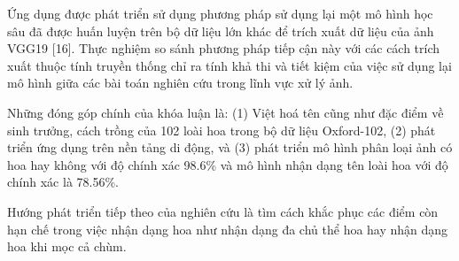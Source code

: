 \documentclass[12pt]{report}
\begin{document}
		Ứng dụng được phát triển sử dụng phương pháp sử dụng lại một mô hình học sâu đã được huấn luyện trên bộ dữ liệu lớn khác để trích xuất dữ liệu của ảnh VGG19 [16]. Thực nghiệm so sánh phương pháp tiếp cận này với các cách trích xuất thuộc tính truyền thống chỉ ra tính khả thi và tiết kiệm của việc sử dụng lại mô hình giữa các bài toán nghiên cứu trong lĩnh vực xử lý ảnh.
																																																								
		Những đóng góp chính của khóa luận là: (1) Việt hoá tên cũng như đặc điểm về sinh trưởng, cách trồng của 102 loài hoa trong bộ dữ liệu Oxford-102, (2) phát triển ứng dụng trên nền tảng di động, và (3) phát triển mô hình phân loại ảnh có hoa hay không với độ chính xác 98.6\% và mô hình nhận dạng tên loài hoa với độ chính xác là 78.56\%.
																																																								
		Hướng phát triển tiếp theo của nghiên cứu là  tìm cách khắc phục các điểm còn hạn chế trong việc nhận dạng hoa như nhận dạng đa chủ thể hoa hay nhận dạng hoa khi mọc cả chùm.															
																																																																						
\end{document}
